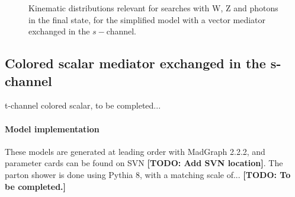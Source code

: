 \begin{figure}[h!]
{    }
    \hfill
    \caption{Kinematic distributions relevant for searches with W, Z and photons in the final state,
    for the simplified model with a vector mediator exchanged in the $s-$channel.}
    \label{fig:DMV_EW_kinematics}
\end{figure}

\subsection{Colored scalar mediator exchanged in the s-channel}

t-channel colored scalar, to be completed...

\paragraph{Model implementation}

These models are generated at leading order with MadGraph 2.2.2, and parameter
cards can be found on SVN \textbf{[TODO: Add SVN location]}.
The parton shower is done using Pythia 8, with a matching scale of...
\textbf{[TODO: To be completed.]}


